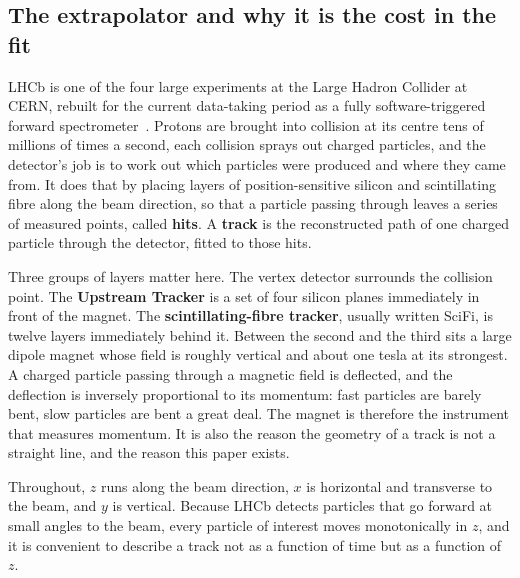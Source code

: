 \documentclass[11pt,a4paper]{article}
\begin{document}
\subsection{The extrapolator and why it is the cost in the fit}
\label{sec:intro-cost}

LHCb is one of the four large experiments at the Large Hadron Collider at CERN,
rebuilt for the current data-taking period as a fully software-triggered
forward spectrometer~\citep{lhcb2024upgrade}. Protons are brought into
collision at its centre tens of millions of times a second, each collision
sprays out charged particles, and the detector's job is to work out which
particles were produced and where they came from. It does that by placing
layers of position-sensitive silicon and scintillating fibre along the beam
direction, so that a particle passing through leaves a series of measured
points, called \textbf{hits}. A \textbf{track} is the reconstructed path of one
charged particle through the detector, fitted to those hits.

Three groups of layers matter here. The vertex detector surrounds the collision
point. The \textbf{Upstream Tracker} is a set of four silicon planes
immediately in front of the magnet. The \textbf{scintillating-fibre tracker},
usually written SciFi, is twelve layers immediately behind it. Between the
second and the third sits a large dipole magnet whose field is roughly
vertical and about one tesla at its strongest. A charged particle passing
through a magnetic field is deflected, and the deflection is inversely
proportional to its momentum: fast particles are barely bent, slow particles
are bent a great deal. The magnet is therefore the instrument that measures
momentum. It is also the reason the geometry of a track is not a straight line,
and the reason this paper exists.

Throughout, $z$ runs along the beam direction, $x$ is horizontal and transverse
to the beam, and $y$ is vertical. Because LHCb detects particles that go
forward at small angles to the beam, every particle of interest moves
monotonically in $z$, and it is convenient to describe a track not as a
function of time but as a function of $z$.
\end{document}

